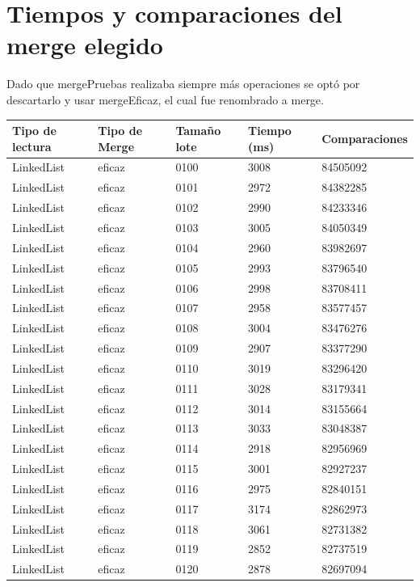 \documentclass[a4paper,11pt]{report}
\begin{document}
\begin{table}[ht]
\section{\label{tablaTiemposComparacionesMerge}Tiempos y comparaciones del merge elegido}
\begin{minipage}{0.95\linewidth}
  Dado que mergePruebas realizaba siempre más operaciones se optó por descartarlo y usar mergeEficaz, el cual fue renombrado a merge.

\centering
\begin{tabular}{>{\ttfamily}l l l l l}
\toprule
\normalfont Tipo de lectura & Tipo de Merge & Tamaño lote & Tiempo (ms) & Comparaciones \\
\midrule
LinkedList & eficaz & 0100 & 3008 & 84505092\\
LinkedList & eficaz & 0101 & 2972 & 84382285\\
LinkedList & eficaz & 0102 & 2990 & 84233346\\
LinkedList & eficaz & 0103 & 3005 & 84050349\\
LinkedList & eficaz & 0104 & 2960 & 83982697\\
LinkedList & eficaz & 0105 & 2993 & 83796540\\
LinkedList & eficaz & 0106 & 2998 & 83708411\\
LinkedList & eficaz & 0107 & 2958 & 83577457\\
LinkedList & eficaz & 0108 & 3004 & 83476276\\
LinkedList & eficaz & 0109 & 2907 & 83377290\\
LinkedList & eficaz & 0110 & 3019 & 83296420\\
LinkedList & eficaz & 0111 & 3028 & 83179341\\
LinkedList & eficaz & 0112 & 3014 & 83155664\\
LinkedList & eficaz & 0113 & 3033 & 83048387\\
LinkedList & eficaz & 0114 & 2918 & 82956969\\
LinkedList & eficaz & 0115 & 3001 & 82927237\\
LinkedList & eficaz & 0116 & 2975 & 82840151\\
LinkedList & eficaz & 0117 & 3174 & 82862973\\
LinkedList & eficaz & 0118 & 3061 & 82731382\\
LinkedList & eficaz & 0119 & 2852 & 82737519\\
LinkedList & eficaz & 0120 & 2878 & 82697094\\

\end{tabular}
\end{minipage}
\end{table}
\end{document}
